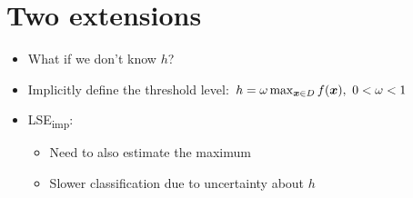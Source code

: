 \documentclass[10pt,mathserif]{beamer}
\newcommand{\iacl}{\textsf{LSE\textsubscript{imp}}\xspace}
\begin{document}
\begin{frame}
\begin{center}
\end{center}
\end{frame}

\section{Two extensions}

\begin{frame}
\begin{itemize}
\item<1-> What if we don't know $h$?
\vspace{1em}
\item<2-> Implicitly define the threshold level: $h = \omega \max_{\bm{x}\in D} f(\bm{x}),\ 0 < \omega < 1$
\vspace{1em}
\item<3-> \iacl:
\begin{itemize}
\item<4-> Need to also estimate the maximum
\item<5-> Slower classification due to uncertainty about $h$
\end{itemize}
\end{itemize}
\begin{center}
\end{center}
\end{frame}
\end{document}
